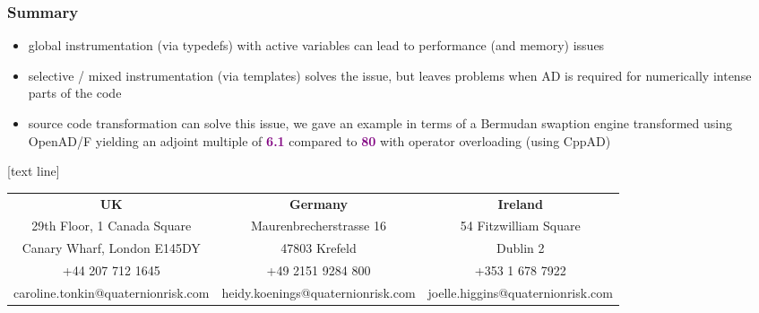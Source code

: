 \documentclass[10pt,German]{beamer}
\begin{document}
\begin{frame}[fragile]
\frametitle{Summary}
\begin{itemize}
\item global instrumentation (via typedefs) with active variables can lead to performance (and memory) issues
\item selective / mixed instrumentation (via templates) solves the issue, but leaves problems when AD is required for numerically intense parts of the code
\item source code transformation can solve this issue, we gave an example in terms of a Bermudan swaption engine transformed using OpenAD/F yielding an adjoint multiple of \textbf{\textcolor{purple}{6.1}} compared to \textbf{\textcolor{purple}{80}} with operator overloading (using CppAD)
\end{itemize}
\end{frame}

[text line]{}

\begin{frame}{}

{\tiny
\color{white}
\begin{center}
\hspace{-0.49cm}
\begin{tabular}{ccc}
{\bf UK}                           & {\bf Germany}           &  {\bf Ireland} \\
29th Floor, 1 Canada Square        & Maurenbrecherstrasse 16 & 54 Fitzwilliam Square\\
Canary Wharf, London E145DY        & 47803 Krefeld           & Dublin 2\\
+44 207 712 1645                   & +49 2151 9284 800       & +353 1 678 7922\\
caroline.tonkin@quaternionrisk.com & heidy.koenings@quaternionrisk.com & joelle.higgins@quaternionrisk.com\\
\end{tabular}
\end{center}
}

\end{frame}
\end{document}
